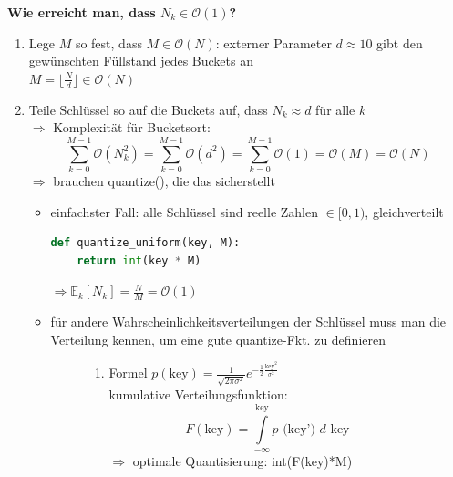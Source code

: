\documentclass[11pt, fleqn]{scrreprt}
\begin{document}
\textbf{Wie erreicht man, dass $N_k \in \mathcal{O}(1)$?}
\begin {enumerate}
	\item Lege $M$ so fest, dass $M \in \mathcal{O}(N)$: externer Parameter $d \approx 10$ gibt den gewünschten Füllstand jedes Buckets an \\
	\hspace*{3cm} $M = \lfloor \frac{N}{d} \rfloor \in \mathcal{O}(N)$
	
	\item Teile Schlüssel so auf die Buckets auf, dass $N_k \approx d$ für alle $k$ \\
	$\Rightarrow$ Komplexität für Bucketsort: 
	\[ \sum_{k=0}^{M-1} \mathcal{O}(N_k^2) = \sum_{k=0}^{M-1} \mathcal{O}(d^2) = \sum_{k=0}^{M-1} \mathcal{O}(1) = \mathcal{O}(M) = \mathcal{O}(N)\]
	$\Rightarrow$ brauchen quantize(), die das sicherstellt
	\begin{itemize}
		\item einfachster Fall: alle Schlüssel sind reelle Zahlen $\in [0, 1)$, gleichverteilt
		\begin{lstlisting}[language=Python]
def quantize_uniform(key, M):
	return int(key * M)
		\end{lstlisting}
		$\Rightarrow \mathbb{E}_k[N_k] = \frac{N}{M} = \mathcal{O}(1)$
		
		\item für andere Wahrscheinlichkeitsverteilungen der Schlüssel muss man die Verteilung kennen, um eine gute quantize-Fkt. zu definieren
		
		\begin{figure}[htbp]
			\begin{minipage}[t]{10cm}
				\centering
				\begin{enumerate}[label={\alph*)}]
					\item Formel $p(\text{key}) = \frac{1}{\sqrt{2\pi \sigma^2}} e^{-\frac{1}{2} \frac{\text{key}^2}{\sigma^2}}$  \\
					\vspace*{5mm}
					kumulative Verteilungsfunktion:
					\[ F(\text{key}) = \int\limits_{-\infty}^{\text{key}} p\text{ (key') } d \text{ key } \]
					\vspace*{5mm}
					$\Rightarrow$ optimale Quantisierung: int(F(key)*M)
					

\end{enumerate}
\end{minipage}
\end{figure}
\end{itemize}
\end{enumerate}
\end{document}
